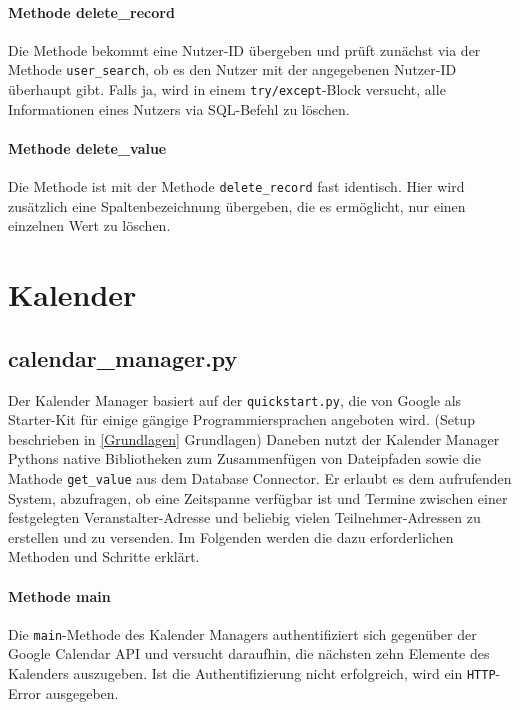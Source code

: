             \paragraph{Methode delete\_record}
                Die Methode bekommt eine Nutzer-ID übergeben und prüft zunächst via der Methode \verb|user_search|, ob es den Nutzer mit der angegebenen Nutzer-ID überhaupt gibt. Falls ja, wird in einem \verb|try/except|-Block versucht, alle Informationen eines Nutzers via SQL-Befehl zu löschen. 


            \paragraph{Methode delete\_value}
                Die Methode ist mit der Methode \verb|delete_record| fast identisch. Hier wird zusätzlich eine Spaltenbezeichnung übergeben, die es ermöglicht, nur einen einzelnen Wert zu löschen.


    \section{Kalender} \label{Kalender}
        
        \subsection{calendar\_manager.py} \label{calendar_manager.py}
        Der Kalender Manager basiert auf der \verb|quickstart.py|, die von Google als Starter-Kit für einige gängige Programmiersprachen angeboten wird. (Setup beschrieben in \ref{Grundlagen} Grundlagen) Daneben nutzt der Kalender Manager Pythons native Bibliotheken zum Zusammenfügen von Dateipfaden sowie die Mathode \verb|get_value| aus dem Database Connector. Er erlaubt es dem aufrufenden System, abzufragen, ob eine Zeitspanne verfügbar ist und Termine zwischen einer festgelegten Veranstalter-Adresse und beliebig vielen Teilnehmer-Adressen zu erstellen und zu versenden. Im Folgenden werden die dazu erforderlichen Methoden und Schritte erklärt. 


            \paragraph{Methode main}
                Die \verb|main|-Methode des Kalender Managers authentifiziert sich gegenüber der Google Calendar API und versucht daraufhin, die nächsten zehn Elemente des Kalenders auszugeben. Ist die Authentifizierung nicht erfolgreich, wird ein \verb|HTTP|-Error ausgegeben. 

